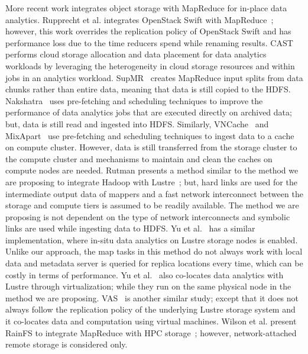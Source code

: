 
More recent work integrates object storage with MapReduce for in-place data analytics. Rupprecht et al.
integrates OpenStack Swift with MapReduce~\cite{rupprechtbd}; however, this work overrides the replication
policy of OpenStack Swift and has performance loss due to the time reducers spend while renaming results.
CAST~\cite{chengcast} performs cloud storage allocation and data placement for data
analytics workloads by leveraging the heterogeneity in cloud storage
resources and within jobs in an analytics workload. SupMR~\cite{supmr} creates MapReduce input splits from data chunks rather
than entire data, meaning that data is still copied to the HDFS. Nakshatra~\cite{nakshatra}
uses pre-fetching and scheduling techniques to improve the performance of data analytics jobs that are executed directly
on archived data; but, data is still read and ingested into HDFS. Similarly, VNCache~\cite{vncache} and MixApart~\cite{180733}
use pre-fetching and scheduling techniques to ingest data to a cache on compute cluster. However, data is still transferred from
the storage cluster to the compute cluster and mechanisms to maintain and clean the caches on compute nodes are needed.
Rutman presents a method similar to the method we are proposing to integrate Hadoop with Lustre~\cite{rutman}; but, hard
links are used for the intermediate output data of mappers and a fast network interconnect between the storage and
compute tiers is assumed to be readily available. The method we are proposing is not dependent on the type of network
interconnects and symbolic links are used while ingesting data to HDFS. Yu et al.~\cite{hadoopyarnprogress} has a similar
implementation, where in-situ data analytics on Lustre storage nodes is enabled. Unlike our approach, the map tasks in this
method do not always work with local data and metadata server is queried for replica locations every time, which can be
costly in terms of performance. Yu et al.~\cite{hadoopyarnprogress} also co-locates data analytics with Lustre through
virtualization; while they run on the same physical node in the method we are proposing. VAS~\cite{hadooplustre} is
another similar study; except that it does not always follow the replication policy of the underlying Lustre storage system
and it co-locates data and computation using virtual machines. Wilson et al. present RainFS to integrate MapReduce with HPC
storage~\cite{wilsonhadoop}; however, network-attached remote storage is considered only.
